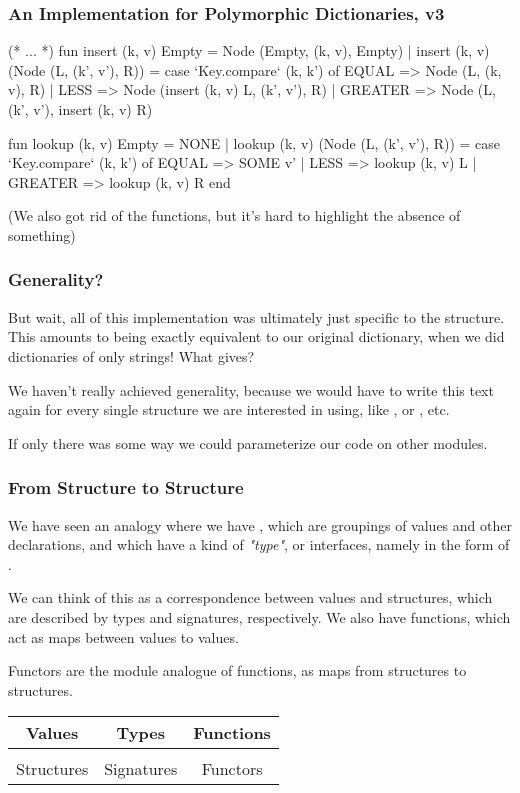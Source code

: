 \documentclass[aspectratio=169]{beamer}
\begin{document}
\begin{frame}[fragile]
  \frametitle{An Implementation for Polymorphic Dictionaries, v3}

  \small
  \begin{codeblock}
    (* ... *)
      fun insert (k, v) Empty = Node (Empty, (k, v), Empty) 
        | insert (k, v) (Node (L, (k', v'), R)) =
            case `Key.compare` (k, k') of
              EQUAL   => Node (L, (k, v), R)
            | LESS    => Node (insert (k, v) L, (k', v'), R)
            | GREATER => Node (L, (k', v'), insert (k, v) R) 

      fun lookup (k, v) Empty = NONE 
        | lookup (k, v) (Node (L, (k', v'), R)) =
            case `Key.compare` (k, k') of
              EQUAL   => SOME v' 
            | LESS    => lookup (k, v) L
            | GREATER => lookup (k, v) R
    end
  \end{codeblock}

  (We also got rid of the  functions, but it's hard to highlight the
  absence of something)
\end{frame}

\begin{frame}[fragile]
  \frametitle{Generality?}

  But wait, all of this implementation was ultimately just specific to the
   structure. This amounts to being exactly equivalent to our
  original dictionary, when we did dictionaries of only strings! What gives?

  We haven't really achieved generality, because we would have to write this
  text again for every single  structure we are interested in using,
  like , or , etc.

  If only there was some way we could parameterize our code on other modules.
\end{frame}


\begin{frame}[fragile]
  \frametitle{From Structure to Structure}

  We have seen an analogy where we have , which are groupings
  of values and other declarations, and which have a kind of \textit{"type"}, or
  interfaces, namely in the form of . 

  We can think of this as a correspondence between values and structures, which
  are described by types and signatures, respectively. We also have functions,
  which act as maps between values to values.

  Functors are the module analogue of functions, as maps from structures to structures.

  \begin{center}
    \begin{tabular}{ c|c|c }
    Values & Types & Functions \\ [0.5ex]
    \hline & \\[-1.5ex]
    Structures & Signatures & Functors 
    \end{tabular}
  \end{center}
\end{frame}
\end{document}
